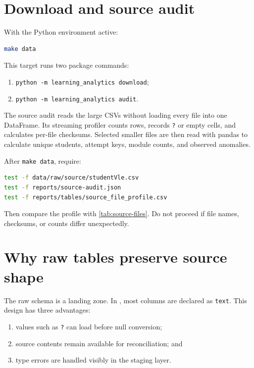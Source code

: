 \section{Download and source audit}

With the Python environment active:

\begin{lstlisting}[language=bash]
make data
\end{lstlisting}

This target runs two package commands:
\begin{enumerate}
  \item \texttt{python -m learning\_analytics download};
  \item \texttt{python -m learning\_analytics audit}.
\end{enumerate}

The source audit reads the large CSVs without loading every file into one
DataFrame. Its streaming profiler counts rows, records \texttt{?} or empty
cells, and calculates per-file checksums. Selected smaller files are then read
with pandas to calculate unique students, attempt keys, module counts, and
observed anomalies.

\begin{validationbox}
After \texttt{make data}, require:
\begin{lstlisting}[language=bash]
test -f data/raw/source/studentVle.csv
test -f reports/source-audit.json
test -f reports/tables/source_file_profile.csv
\end{lstlisting}
Then compare the profile with \cref{tab:source-files}. Do not proceed if file
names, checksums, or counts differ unexpectedly.
\end{validationbox}

\section{Why raw tables preserve source shape}

The raw schema is a landing zone. In
, most columns are declared as
\texttt{text}. This design has three advantages:

\begin{enumerate}
  \item values such as \texttt{?} can load before null conversion;
  \item source contents remain available for reconciliation; and
  \item type errors are handled visibly in the staging layer.
\end{enumerate}

